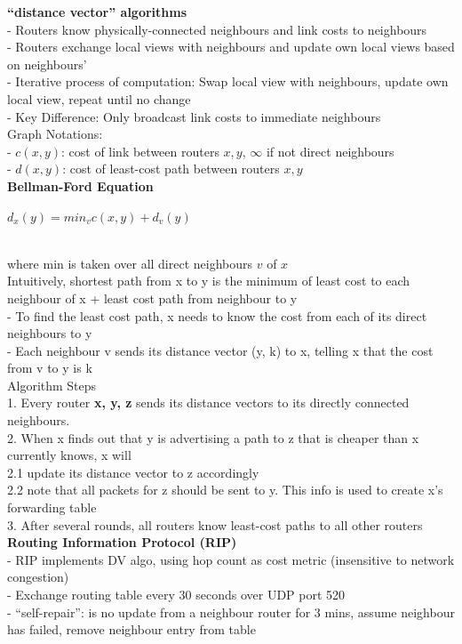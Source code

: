 \documentclass[10pt, a4paper]{article}
\newcommand{\blue}[1]{{\color{MidnightBlue}#1}}
\newcommand{\tab}[0]{\hspace*{2mm}}
\begin{document}
\begin{multicols*}{3}
		\textbf{``distance vector'' algorithms}\\
		- Routers know physically-connected neighbours and link costs to neighbours\\
		- Routers \blue{exchange} local views with neighbours and update own local views based on neighbours'\\
		- Iterative process of computation: Swap local view with neighbours, update own local view, repeat until no change\\
		- \blue{Key Difference:} Only broadcast link costs to immediate neighbours\\

		Graph Notations:\\
		- $c(x, y)$: cost of link between routers $x, y$, $\infty$ if not direct neighbours\\
		- $d(x, y)$: cost of least-cost path between routers $x, y$\\

		\textbf{Bellman-Ford Equation}\\
		\centerline{$d_{x}(y) = min_{v}{c(x, y) + d_{v}(y)}$}\\
		where min is taken over all direct neighbours $v$ of $x$\\

		Intuitively, shortest path from x to y is the minimum of least cost to each neighbour of x + least cost path from neighbour to y\\
		- To find the least cost path, x needs to know the cost from each of its direct neighbours to y\\
		- Each neighbour v sends its \blue{distance vector (y, k)} to x, telling x that the cost from v to y is k\\

		Algorithm Steps\\
		1. Every router \textbf{x, y, z} sends its distance vectors to its directly connected neighbours.\\
		2. When x finds out that y is advertising a path to z that is cheaper than x currently knows, x will\\
		\tab 2.1 \blue{update its distance vector to z} accordingly\\
		\tab 2.2 note that \blue{all packets for z should be sent to y}. This info is used to create x's forwarding table\\
		3. After several rounds, all routers know least-cost paths to all other routers\\

		\textbf{Routing Information Protocol (RIP)}\\
		- RIP implements DV algo, using \blue{hop count} as cost metric (insensitive to network congestion)\\
		- Exchange routing table every 30 seconds over \blue{UDP port 520}\\
		- ``self-repair'': is no update from a neighbour router for 3 mins, assume neighbour has failed, remove neighbour entry from table\\


\end{multicols*}
\end{document}
